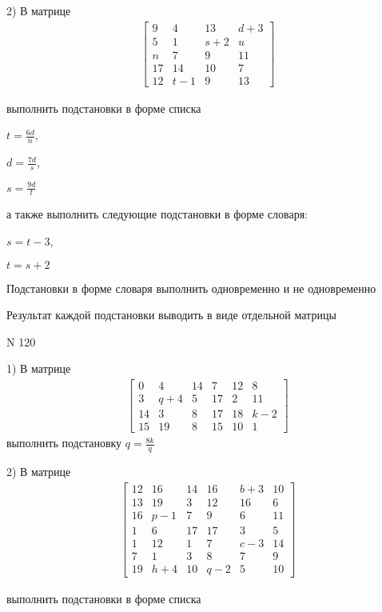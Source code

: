 \documentclass[11pt]{report}
\begin{document}
    2) В матрице
\begin{align*}
\left[\begin{matrix}9 & 4 & 13 & d + 3\\5 & 1 & s + 2 & u\\n & 7 & 9 & 11\\17 & 14 & 10 & 7\\12 & t - 1 & 9 & 13\end{matrix}\right]
\end{align*}

выполнить подстановки в форме списка

$t=\frac{6 d}{n}$,

$d=\frac{7 d}{s}$,

$s=\frac{9 d}{t}$

а также выполнить следующие подстановки в форме словаря:

$s=t - 3$,

$t=s + 2$


    Подстановки в форме словаря выполнить одновременно и не одновременно


    Результат каждой подстановки выводить в виде отдельной матрицы

\newpage
N 120


    1) В матрице
\begin{align*}
\left[\begin{matrix}0 & 4 & 14 & 7 & 12 & 8\\3 & q + 4 & 5 & 17 & 2 & 11\\14 & 3 & 8 & 17 & 18 & k - 2\\15 & 19 & 8 & 15 & 10 & 1\end{matrix}\right]
\end{align*}
выполнить подстановку $q=\frac{8 k}{q}$


    2) В матрице
\begin{align*}
\left[\begin{matrix}12 & 16 & 14 & 16 & b + 3 & 10\\13 & 19 & 3 & 12 & 16 & 6\\16 & p - 1 & 7 & 9 & 6 & 11\\1 & 6 & 17 & 17 & 3 & 5\\1 & 12 & 1 & 7 & c - 3 & 14\\7 & 1 & 3 & 8 & 7 & 9\\19 & h + 4 & 10 & q - 2 & 5 & 10\end{matrix}\right]
\end{align*}

выполнить подстановки в форме списка
\end{document}
